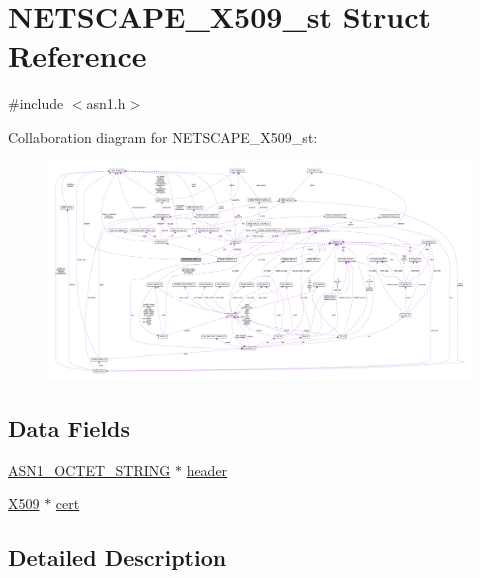 \hypertarget{struct_n_e_t_s_c_a_p_e___x509__st}{}\section{N\+E\+T\+S\+C\+A\+P\+E\+\_\+\+X509\+\_\+st Struct Reference}
\label{struct_n_e_t_s_c_a_p_e___x509__st}


{\ttfamily \#include $<$asn1.\+h$>$}



Collaboration diagram for N\+E\+T\+S\+C\+A\+P\+E\+\_\+\+X509\+\_\+st\+:\nopagebreak
\begin{figure}[H]
\begin{center}
\leavevmode
\includegraphics[width=350pt]{struct_n_e_t_s_c_a_p_e___x509__st__coll__graph}
\end{center}
\end{figure}
\subsection*{Data Fields}
\begin{DoxyCompactItemize}
\item 
\hyperlink{crypto_2ossl__typ_8h_afbd05e94e0f0430a2b729473efec88c1}{A\+S\+N1\+\_\+\+O\+C\+T\+E\+T\+\_\+\+S\+T\+R\+I\+NG} $\ast$ \hyperlink{struct_n_e_t_s_c_a_p_e___x509__st_a7e0a82ad04ea0d1a7839912a32169f09}{header}
\item 
\hyperlink{crypto_2ossl__typ_8h_a4f666bde6518f95deb3050c54b408416}{X509} $\ast$ \hyperlink{struct_n_e_t_s_c_a_p_e___x509__st_a2fb0a168ce33f1f9ce519813d94887f0}{cert}
\end{DoxyCompactItemize}


\subsection{Detailed Description}


